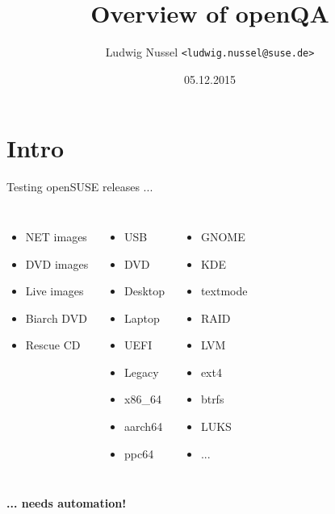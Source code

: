\documentclass[
]{beamer}
\title{Overview of openQA}
\author[Ludwig Nussel]{Ludwig Nussel \texttt{<ludwig.nussel@suse.de>}}
\date{05.12.2015}
\institute[SUSE]{SUSE Linux GmbH}
\begin{document}
{
  \usebackgroundtemplate{}
  \begin{frame}[plain]
    
  \end{frame}
}


\section{Intro}
\begin{frame}{Testing openSUSE releases ...}
  \begin{columns}[T]
    \begin{itemize}
      \item NET images
      \item DVD images
      \item Live images
      \item Biarch DVD
      \item Rescue CD
    \end{itemize}
    \pause
    \begin{itemize}
      \item USB
      \item DVD
      \item Desktop
      \item Laptop
      \item UEFI
      \item Legacy
      \item x86\_64
      \item aarch64
      \item ppc64
    \end{itemize}
    \pause
    \begin{itemize}
      \item GNOME
      \item KDE
      \item textmode
      \item RAID
      \item LVM
      \item ext4
      \item btrfs
      \item LUKS
      \item ...
    \end{itemize}
  \end{columns}
  \pause
  \textbf{... needs automation!}
\end{frame}
\end{document}
